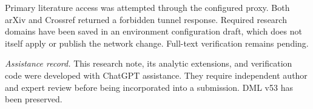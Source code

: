 \documentclass[11pt]{article}
\begin{document}
Primary literature access was attempted through the configured
proxy. Both arXiv and Crossref returned a forbidden tunnel response.
Required research domains have been saved in an environment
configuration draft, which does not itself apply or publish the
network change. Full-text verification remains pending.

\medskip
\noindent\textit{Assistance record.} This research note, its analytic
extensions, and verification code were developed with ChatGPT
assistance. They require independent author and expert review before
being incorporated into a submission. DML v53 has been preserved.
\end{document}

